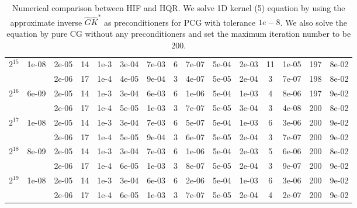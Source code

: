 \documentclass[11pt]{article}
\begin{document}
\begin{table}[!htbp]
\begin{tabular}{|c|c|c|c|c|c|c|c|c|c|c|c|c|c|c|}
\hline
$2^{15}$ & 1e-08 & 2e-05 & 14 & 1e-3 & 3e-04 & 7e-03 & 6 & 7e-07 & 5e-04 & 2e-03 & 11 & 1e-05 & 197 & 8e-02\\
~ & ~ & 2e-06 & 17 & 1e-4 & 4e-05 & 9e-04 & 3 & 4e-07 & 5e-05 & 2e-04 & 3 & 7e-07 & 198 & 8e-02\\
\hline
$2^{16}$ & 6e-09 & 2e-05 & 14 & 1e-3 & 3e-04 & 6e-03 & 6 & 1e-06 & 5e-04 & 1e-03 & 4 & 8e-06 & 197 & 9e-02\\
~ & ~ & 2e-06 & 17 & 1e-4 & 5e-05 & 1e-03 & 3 & 7e-07 & 5e-05 & 3e-04 & 3 & 4e-08 & 200 & 8e-02\\
\hline
$2^{17}$ & 1e-08 & 2e-05 & 14 & 1e-3 & 3e-04 & 7e-03 & 6 & 5e-07 & 5e-04 & 1e-03 & 6 & 3e-06 & 200 & 9e-02\\
~ & ~ & 2e-06 & 17 & 1e-4 & 5e-05 & 9e-04 & 3 & 6e-07 & 5e-05 & 2e-04 & 3 & 7e-07 & 200 & 9e-02\\
\hline
$2^{18}$ & 8e-09 & 2e-05 & 14 & 1e-3 & 3e-04 & 7e-03 & 6 & 1e-06 & 5e-04 & 2e-03 & 5 & 6e-06 & 200 & 8e-02\\
~ & ~ & 2e-06 & 17 & 1e-4 & 6e-05 & 1e-03 & 3 & 8e-07 & 5e-05 & 2e-04 & 3 & 9e-07 & 200 & 9e-02\\
\hline
$2^{19}$ & 1e-08 & 2e-05 & 14 & 1e-3 & 3e-04 & 6e-03 & 6 & 2e-06 & 5e-04 & 1e-03 & 6 & 3e-06 & 200 & 9e-02\\
~ & ~ & 2e-06 & 17 & 1e-4 & 6e-05 & 1e-03 & 3 & 7e-07 & 5e-05 & 2e-04 & 4 & 2e-07 & 200 & 9e-02\\



\end{tabular}

\caption{Numerical comparison between HIF and HQR. We solve 1D kernel (5) equation by using the approximate inverse $\hat{G}\hat{K}^{*}$ as preconditioners for PCG with tolerance $1e-8$. We also solve the equation by pure CG without any preconditioners and set the maximum iteration number to be 200.}
\label{1d-k5}
\end{table}



 

\end{document}
